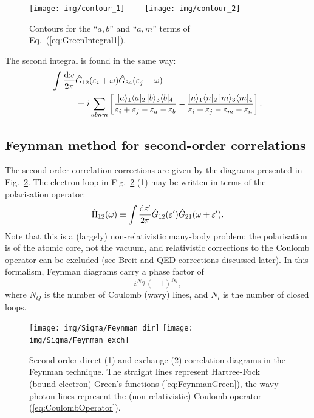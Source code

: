 \documentclass[10pt,twocolumn,a4paper]{article}%
\newcommand{\bra}[1]{\ensuremath{\langle #1|}}	%
\newcommand{\ket}[1]{\ensuremath{|#1\rangle}}	%
\newcommand{\be}{\begin{equation}}
\newcommand{\ee}{\end{equation}}
\def\d{\ensuremath{{\rm d}}}
\def\en{\ensuremath{\varepsilon}}
\newcommand{\w}{\ensuremath{\omega}}
\begin{document}
\begin{figure}%
\centering
\texttt{[image: img/contour\_1]}~~~~
\texttt{[image: img/contour\_2]}
\caption{\small Contours for the ``$a,b$'' and ``$a,m$'' terms of Eq.~(\ref{eq:GreenIntegral1}).\label{fig:contour}}
\end{figure}

The second integral is found in the same way:
\begin{align}
\int \frac{\d \w}{2\pi}&\hat G_{12}(\en_i+\w) \hat G_{34}(\en_j - \omega)\notag\\
&=
i\sum_{abnm}\left[
\frac{\ket{a}_1\bra{a}_2 \, \ket{b}_3\bra{b}_4}{\en_i+\en_j - \en_a - \en_b}
-
\frac{\ket{n}_1\bra{n}_2 \, \ket{m}_3\bra{m}_4}{\en_i + \en_j - \en_m - \en_n}
\right].
\label{eq:GreenInt2}
\end{align}



\subsection{Feynman method for second-order correlations}



The second-order correlation corrections are given by the diagrams presented in Fig.~\ref{fig:Sigma2-Feyn}.
The electron loop in Fig.~\ref{fig:Sigma2-Feyn} (1) may be written in terms of the polarisation operator:
\be\label{eq:PolarisationOperator}
\hat\Pi_{12}(\w) \equiv \int \frac{\d \en'}{2\pi}\hat  G_{12}(\en') \hat G_{21}(\w+\en') .
\ee
Note that this is a (largely) non-relativistic many-body problem; the polarisation is of the atomic core, not the vacuum, and relativistic corrections to the Coulomb operator can be excluded (see Breit and QED corrections discussed later).
In this formalism, Feynman diagrams carry a phase factor of~\cite{Abrikosov1965}
\be\label{eq:phaseFactor}
i^{N_{Q}}(-1)^{N_{l}},
\ee
where $N_{Q}$ is the number of Coulomb (wavy) lines, and $N_{l}$ is the number of closed loops.


\begin{figure}%
\centering
\texttt{[image: img/Sigma/Feynman\_dir]}
\texttt{[image: img/Sigma/Feynman\_exch]}
\caption{\label{fig:Sigma2-Feyn}\small Second-order direct (1) and exchange (2) correlation diagrams in the Feynman technique.
The straight lines represent Hartree-Fock (bound-electron) Green's functions (\ref{eq:FeynmanGreen}),
the wavy photon lines represent the (non-relativistic) Coulomb operator (\ref{eq:CoulombOperator}).
}
\end{figure}
\end{document}
